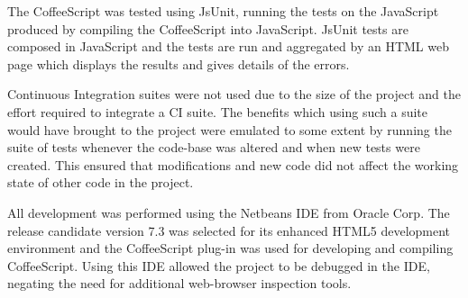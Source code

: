 The Coffee\-Script was tested using JsUnit, running the tests on the Java\-Script produced by compiling the Coffee\-Script into Java\-Script. JsUnit tests are composed in Java\-Script and the tests are run and aggregated by an HTML web page which displays the results and gives details of the errors.

Continuous Integration suites were not used due to the size of the project and the effort required to integrate a CI suite. The benefits which using such a suite would have brought to the project were emulated to some extent by running the suite of tests whenever the code-base was altered and when new tests were created. This ensured that modifications and new code did not affect the working state of other code in the project.

All development was performed using the Netbeans IDE from Oracle Corp. The release candidate version 7.3 was selected for its enhanced HTML5 development environment and the Coffee\-Script plug-in was used for developing and compiling Coffee\-Script. Using this IDE allowed the project to be debugged in the IDE, negating the need for additional web-browser inspection tools.